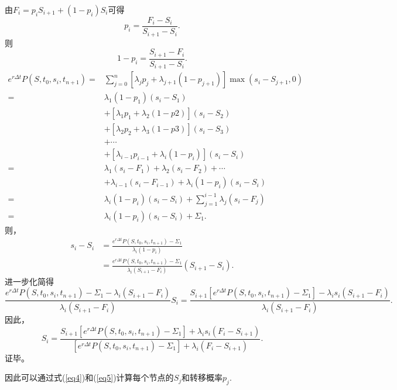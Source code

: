 \begin{Proof}
	由$F_i = p_iS_{i+1}+(1-p_i)S_i$可得
	$$p_i = \frac{F_i-S_i}{S_{i+1}-S_i }.$$
	则
	$$1-p_i = \frac{S_{i+1}-F_i}{S_{i+1}-S_i}.$$
	\begin{align}
		e^{r\Delta t}P(S,t_0,s_i,t_{n+1}) =& \sum_{j=0}^n \left[\lambda_jp_j+\lambda_{j+1}(1-p_{j+1})\right]\max(s_i-S_{j+1},0) \nonumber\\
		=&\lambda_1(1-p_1)(s_i-S_1) \nonumber\\
		& + \left[\lambda_1p_1+\lambda_2(1-p2)\right](s_i-S_2) \nonumber\\
		& + \left[\lambda_2p_2+\lambda_3(1-p3)\right](s_i-S_3) \nonumber\\
		& + \cdots \nonumber\\
		& + \left[\lambda_{i-1}p_{i-1}+\lambda_i(1-p_i)\right](s_i-S_i) \nonumber\\
		=& \lambda_1 (s_i-F_1) + \lambda_2 (s_i-F_2)+\cdots \nonumber\\
		& + \lambda_{i-1}(s_i-F_{i-1}) + \lambda_i(1-p_i)(s_i-S_i) \nonumber\\
		=&  \lambda_i(1-p_i)(s_i-S_i) + \sum_{j=1}^{i-1}\lambda_j(s_i-F_j) \nonumber \\
		=& \lambda_i(1-p_i)(s_i-S_i) +\Sigma_1. \nonumber
	\end{align}
	则，
	\begin{align}
		s_i-S_i &= \frac{e^{r\Delta t}P(S,t_0,s_i,t_{n+1})-\Sigma_1}{\lambda_i(1-p_i)} \nonumber\\
						&=\frac{e^{r\Delta t}P(S,t_0,s_i,t_{n+1})-\Sigma_1}{\lambda_i(S_{i+1}-F_i)} (S_{i+1}-S_i).\nonumber
	\end{align}
	进一步化简得
	$$\frac{e^{r\Delta t}P(S,t_0,s_i,t_{n+1})-\Sigma_1-\lambda_i(S_{i+1}-F_i)}{\lambda_i(S_{i+1}-F_i)}S_i = 
	\frac{S_{i+1}\left[e^{r\Delta t}P(S,t_0,s_i,t_{n+1})-\Sigma_1\right]-\lambda_is_i(S_{i+1}-F_i)}{\lambda_i(S_{i+1}-F_i)}.$$
	因此，
	$$S_{i} = \frac{S_{i+1}\left[e^{r\Delta t}P(S,t_0,s_i,t_{n+1}) -\Sigma_1 \right]+\lambda_is_i(F_i-S_{i+1})}{\left[e^{r\Delta t}P(S,t_0,s_i,t_{n+1}) -\Sigma_1 \right]+\lambda_i(F_i-S_{i+1})}.$$
	证毕。
\end{Proof}
因此可以通过式(\ref{eq4})和(\ref{eq5})计算每个节点的$S_{j}$和转移概率$p_j$.


